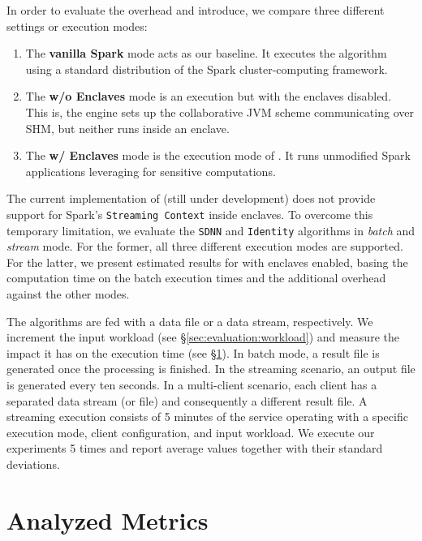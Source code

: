 In order to evaluate the overhead \sgxspark and \projName introduce, we compare three different settings or execution modes:
\begin{enumerate}
    \item The \textbf{vanilla Spark} mode acts as our baseline. It executes the algorithm using a standard distribution of the Spark cluster-computing framework.
    \item The \textbf{\sgxspark w/o Enclaves} mode is an \sgxspark execution but with the enclaves disabled. This is, the engine sets up the collaborative JVM scheme communicating over SHM, but neither runs inside an enclave.
    \item The \textbf{\sgxspark w/ Enclaves} mode is the execution mode of \projName. It runs unmodified Spark applications leveraging \sgx for sensitive computations.
\end{enumerate}
The current implementation of \sgxspark (still under development) does not provide support for Spark's \texttt{Streaming Context} inside enclaves. 
To overcome this temporary limitation, we evaluate the \texttt{SDNN} and \texttt{Identity} algorithms in \emph{batch} and \emph{stream} mode. 
For the former, all three different execution modes are supported.
For the latter, we present estimated results for \sgxspark with enclaves enabled, basing the computation time on the batch execution times and the additional overhead against the other modes.

The algorithms are fed with a data file or a data stream, respectively.
We increment the input workload (see \S\ref{sec:evaluation:workload}) and measure the impact it has on the execution time (see \S\ref{sec:evaluation:metrics}).
In batch mode, a result file is generated once the processing is finished.
In the streaming scenario, an output file is generated every ten seconds.
In a multi-client scenario, each client has a separated data stream (or file) and consequently a different result file.
A streaming execution consists of 5 minutes of the service operating with a specific execution mode, client configuration, and input workload.
We execute our experiments 5 times and report average values together with their standard deviations.

\section{Analyzed Metrics} \label{sec:evaluation:metrics}

